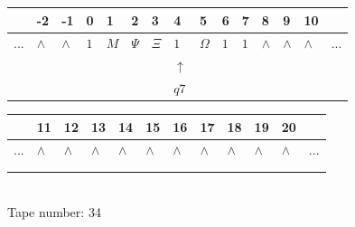 \documentclass[11pt]{article}
\begin{document}
\begin{table}[H]
\centering
\begin{tabular}{lllllllllllllll}
 & -2 & -1 & 0 & 1 & 2 & 3 & 4 & 5 & 6 & 7 & 8 & 9 & 10 & \\
\hline
$...$ & \multicolumn{1}{|l|}{$\wedge$} & \multicolumn{1}{|l|}{$\wedge$} & \multicolumn{1}{|l|}{$1$} & \multicolumn{1}{|l|}{$M$} & \multicolumn{1}{|l|}{$\Psi$} & \multicolumn{1}{|l|}{$\Xi$} & \multicolumn{1}{|l|}{$1$} & \multicolumn{1}{|l|}{$\Omega$} & \multicolumn{1}{|l|}{$1$} & \multicolumn{1}{|l|}{$1$} & \multicolumn{1}{|l|}{$\wedge$} & \multicolumn{1}{|l|}{$\wedge$} & \multicolumn{1}{|l|}{$\wedge$} & $...$\\
\hline
&  &  &  &  &  &  & $\uparrow$ &  &  &  &  &  &  &  \\
&  &  &  &  &  &  & $ q7 $ &  &  &  &  &  &  &  \\
\end{tabular}
\begin{tabular}{llllllllllll}
 & 11 & 12 & 13 & 14 & 15 & 16 & 17 & 18 & 19 & 20 & \\
\hline
$...$ & \multicolumn{1}{|l|}{$\wedge$} & \multicolumn{1}{|l|}{$\wedge$} & \multicolumn{1}{|l|}{$\wedge$} & \multicolumn{1}{|l|}{$\wedge$} & \multicolumn{1}{|l|}{$\wedge$} & \multicolumn{1}{|l|}{$\wedge$} & \multicolumn{1}{|l|}{$\wedge$} & \multicolumn{1}{|l|}{$\wedge$} & \multicolumn{1}{|l|}{$\wedge$} & \multicolumn{1}{|l|}{$\wedge$} & $...$\\
\hline
&  &  &  &  &  &  &  &  &  &  &  \\
&  &  &  &  &  &  &  &  &  &  &  \\
\end{tabular}
\\
Tape number: 34
\noindent\makebox[\linewidth]{\hdashrule{\textwidth}{1pt}{1pt}}\end{table}
\end{document}
